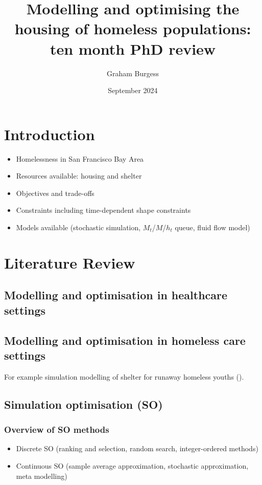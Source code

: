 \documentclass{article}
\title{Modelling and optimising the housing of homeless populations: ten month PhD review}
\author{Graham Burgess}
\date{September 2024}
\begin{document}
\maketitle

\section{Introduction}

\begin{itemize}
\item Homelessness in San Francisco Bay Area
\item Resources available: housing and shelter
\item Objectives and trade-offs
\item Constraints including time-dependent shape constraints
\item Models available (stochastic simulation, $M_t$/$M$/$h_t$ queue, fluid flow model)
\end{itemize}

\section{Literature Review}

\subsection{Modelling and optimisation in healthcare settings}



\subsection{Modelling and optimisation in homeless care settings}

For example simulation modelling of shelter for runaway homeless youths (\cite{kaya2022discrete}).

\subsection{Simulation optimisation (SO)}

\subsubsection{Overview of SO methods}

\begin{itemize}
\item Discrete SO (ranking and selection, random search, integer-ordered methods)
\item Continuous SO (sample average approximation, stochastic approximation, meta modelling)
\end{itemize}
\end{document}
